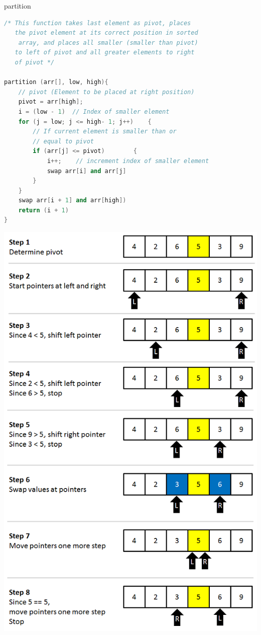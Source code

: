 \documentclass[a4paper,11pt,twoside]{book}
\begin{document}
	\par partition 
\begin{lstlisting}[frame=single, language=c++]
/* This function takes last element as pivot, places
   the pivot element at its correct position in sorted
    array, and places all smaller (smaller than pivot)
   to left of pivot and all greater elements to right
   of pivot */
   
partition (arr[], low, high){
    // pivot (Element to be placed at right position)
    pivot = arr[high];   
    i = (low - 1)  // Index of smaller element
    for (j = low; j <= high- 1; j++)    {
        // If current element is smaller than or
        // equal to pivot
        if (arr[j] <= pivot)        {
            i++;    // increment index of smaller element
            swap arr[i] and arr[j]
        }
    }
    swap arr[i + 1] and arr[high])
    return (i + 1)
}
\end{lstlisting}

\begin{center}
	\includegraphics[scale=0.45]{pics/qsort1.png} 
\end{center}
\end{document}
